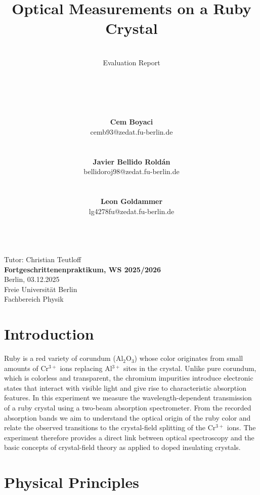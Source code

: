 \documentclass[a4paper]{article}
\title{\textbf{Optical Measurements on a Ruby Crystal}}
\author{
  \\Evaluation Report \\\\\\\\\\\\
  \textbf{Cem Boyaci} \\
  cemb93@zedat.fu-berlin.de \\\\\\
  \textbf{Javier Bellido Roldán}\\
  bellidoroj98@zedat.fu-berlin.de \\\\\\
  \textbf{Leon Goldammer} \\
  lg4278fu@zedat.fu-berlin.de \\\\
}
\date{}
\begin{document}
\maketitle
\thispagestyle{empty}

\section*{}
\begin{center}
\vspace{3cm}
Tutor: Christian Teutloff \\[1cm]
\textbf{Fortgeschrittenenpraktikum, WS 2025/2026}\\
Berlin, 03.12.2025\\
Freie Universität Berlin\\
Fachbereich Physik
\end{center}



\clearpage
\renewcommand*\contentsname{\huge Contents}
{
  \tableofcontents
  \clearpage
}



\newpage
\setcounter{page}{1} 
\section{Introduction}

Ruby is a red variety of corundum (Al$_2$O$_3$) whose color originates from small amounts of Cr$^{3+}$ ions replacing Al$^{3+}$ sites in the crystal.
Unlike pure corundum, which is colorless and transparent, the chromium impurities introduce electronic states that interact with visible light and give rise to characteristic absorption features.
In this experiment we measure the wavelength-dependent transmission of a ruby crystal using a two-beam absorption spectrometer.
From the recorded absorption bands we aim to understand the optical origin of the ruby color and relate the observed transitions to the crystal-field splitting of the Cr$^{3+}$ ions.
The experiment therefore provides a direct link between optical spectroscopy and the basic concepts of crystal-field theory as applied to doped insulating crystals.



\section{Physical Principles}
\end{document}
